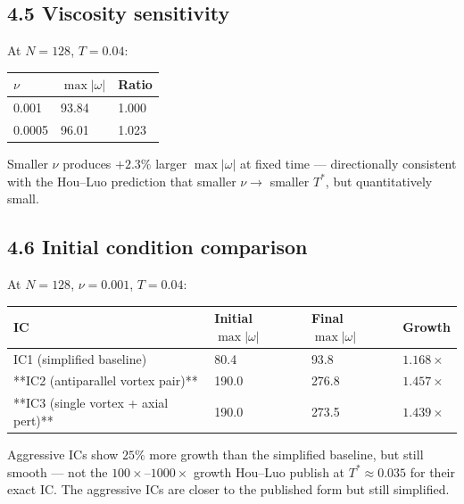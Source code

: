 \documentclass[11pt]{article}
\begin{document}
\subsection*{4.5 Viscosity sensitivity}

At \(N = 128\), \(T = 0.04\):

\begin{table}[h]
\centering
\begin{tabular}{lll}
\toprule
\(\nu\) & \(\max|\omega|\) & Ratio \\
\midrule
0.001 & 93.84 & 1.000 \\
0.0005 & 96.01 & 1.023 \\
\bottomrule
\end{tabular}
\end{table}


Smaller \(\nu\) produces \(+2.3\%\) larger \(\max|\omega|\) at fixed time —
directionally consistent with the Hou–Luo prediction that smaller
\(\nu \to\) smaller \(T^*\), but quantitatively small.


\subsection*{4.6 Initial condition comparison}

At \(N = 128\), \(\nu = 0.001\), \(T = 0.04\):

\begin{table}[h]
\centering
\begin{tabular}{llll}
\toprule
IC & Initial \(\max|\omega|\) & Final \(\max|\omega|\) & Growth \\
\midrule
IC1 (simplified baseline) & 80.4 & 93.8 & \(1.168\times\) \\
**IC2 (antiparallel vortex pair)** & 190.0 & 276.8 & \(\mathbf{1.457\times}\) \\
**IC3 (single vortex + axial pert)** & 190.0 & 273.5 & \(\mathbf{1.439\times}\) \\
\bottomrule
\end{tabular}
\end{table}


Aggressive ICs show \(25\%\) more growth than the simplified baseline,
but still smooth — not the \(100\times\)–\(1000\times\) growth Hou–Luo
publish at \(T^* \approx 0.035\) for their exact IC. The aggressive ICs
are closer to the published form but still simplified.
\end{document}
